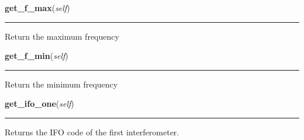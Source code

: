     \label{stochastic:StochasticNode:get_f_max}
    \vspace{0.5ex}

    \begin{boxedminipage}{\textwidth}

    \raggedright \textbf{get\_f\_max}(\textit{self})

    \vspace{-1.5ex}

    \rule{\textwidth}{0.5\fboxrule}
    Return the maximum frequency

    \vspace{1ex}

    \end{boxedminipage}

    \label{stochastic:StochasticNode:get_f_min}
    \vspace{0.5ex}

    \begin{boxedminipage}{\textwidth}

    \raggedright \textbf{get\_f\_min}(\textit{self})

    \vspace{-1.5ex}

    \rule{\textwidth}{0.5\fboxrule}
    Return the minimum frequency

    \vspace{1ex}

    \end{boxedminipage}

    \label{stochastic:StochasticNode:get_ifo_one}
    \vspace{0.5ex}

    \begin{boxedminipage}{\textwidth}

    \raggedright \textbf{get\_ifo\_one}(\textit{self})

    \vspace{-1.5ex}

    \rule{\textwidth}{0.5\fboxrule}
    Returns the IFO code of the first interferometer.

    \vspace{1ex}

    \end{boxedminipage}

